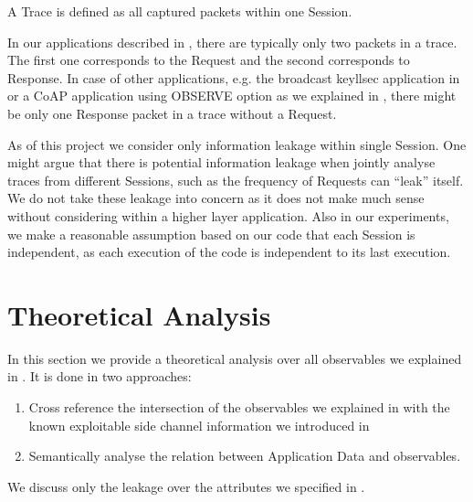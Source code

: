 \begin{definition} \label{Def: Trace}
A Trace is defined as all captured packets within one Session.
\end{definition}

In our applications described in , there are typically only two packets in a trace. The first one corresponds to the Request and the second corresponds to Response. In case of other applications, e.g. the broadcast keyllsec application in  or a CoAP application using OBSERVE option as we explained in , there might be only one Response packet in a trace without a Request.

As of this project we consider only information leakage within single Session. One might argue that there is potential information leakage when jointly analyse traces from different Sessions, such as the frequency of Requests can ``leak'' itself. We do not take these leakage into concern as it does not make much sense without considering within a higher layer application. Also in our experiments, we make a reasonable assumption based on our code that each Session is independent, as each execution of the code is independent to its last execution.


\section{Theoretical Analysis}

In this section we provide a theoretical analysis over all observables we explained in . It is done in two approaches:

\begin{enumerate}
	\item Cross reference the intersection of the observables we explained in  with the known exploitable side channel information we introduced in 
	\item Semantically analyse the relation between Application Data and observables. 
\end{enumerate}

We discuss only the leakage over the attributes we specified in .

